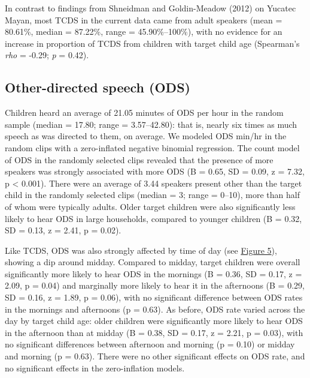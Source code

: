 \documentclass[floatsintext,man]{apa6}
\theoremstyle{definition}
\theoremstyle{definition}
\theoremstyle{definition}
\theoremstyle{remark}
\begin{document}
In contrast to findings from Shneidman and Goldin-Meadow (2012) on
Yucatec Mayan, most TCDS in the current data came from adult speakers
(mean = 80.61\%, median = 87.22\%, range = 45.90\%--100\%), with no
evidence for an increase in proportion of TCDS from children with target
child age (Spearman's \emph{rho} = -0.29; \emph{p} = 0.42).

\subsection{Other-directed speech
(ODS)}\label{other-directed-speech-ods}

Children heard an average of 21.05 minutes of ODS per hour in the random
sample (median = 17.80; range = 3.57--42.80): that is, nearly six times
as much speech as was directed to them, on average. We modeled ODS
min/hr in the random clips with a zero-inflated negative binomial
regression. The count model of ODS in the randomly selected clips
revealed that the presence of more speakers was strongly associated with
more ODS (B = 0.65, SD = 0.09, z = 7.32, p \textless{} 0.001). There
were an average of 3.44 speakers present other than the target child in
the randomly selected clips (median = 3; range = 0--10), more than half
of whom were typically adults. Older target children were also
significantly less likely to hear ODS in large households, compared to
younger children (B = 0.32, SD = 0.13, z = 2.41, p = 0.02).

Like TCDS, ODS was also strongly affected by time of day (see
\protect\hyperlink{fig5}{Figure 5}), showing a dip around midday.
Compared to midday, target children were overall significantly more
likely to hear ODS in the mornings (B = 0.36, SD = 0.17, z = 2.09, p =
0.04) and marginally more likely to hear it in the afternoons (B = 0.29,
SD = 0.16, z = 1.89, p = 0.06), with no significant difference between
ODS rates in the mornings and afternoons (p = 0.63). As before, ODS rate
varied across the day by target child age: older children were
significantly more likely to hear ODS in the afternoon than at midday (B
= 0.38, SD = 0.17, z = 2.21, p = 0.03), with no significant differences
between afternoon and morning (p = 0.10) or midday and morning (p =
0.63). There were no other significant effects on ODS rate, and no
significant effects in the zero-inflation models.
\end{document}

